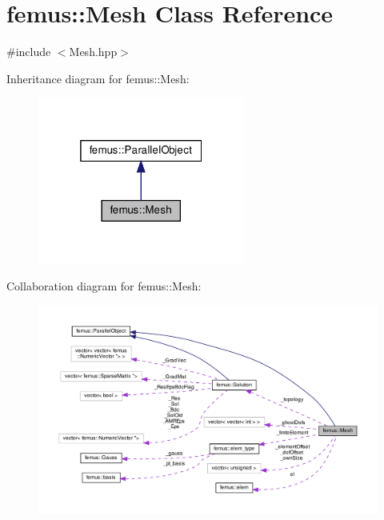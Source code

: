 \hypertarget{classfemus_1_1_mesh}{}\section{femus\+:\+:Mesh Class Reference}
\label{classfemus_1_1_mesh}


{\ttfamily \#include $<$Mesh.\+hpp$>$}



Inheritance diagram for femus\+:\+:Mesh\+:
\nopagebreak
\begin{figure}[H]
\begin{center}
\leavevmode
\includegraphics[width=193pt]{classfemus_1_1_mesh__inherit__graph}
\end{center}
\end{figure}


Collaboration diagram for femus\+:\+:Mesh\+:
\nopagebreak
\begin{figure}[H]
\begin{center}
\leavevmode
\includegraphics[width=350pt]{classfemus_1_1_mesh__coll__graph}
\end{center}
\end{figure}
